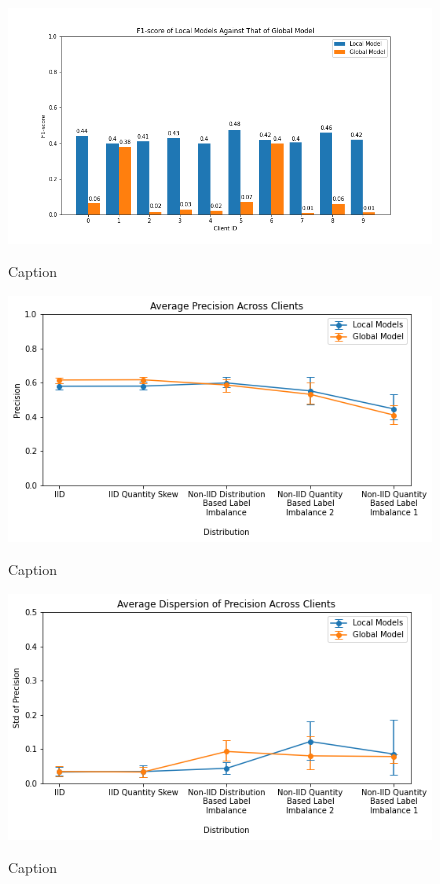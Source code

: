 \documentclass[letterpaper]{article} %
\begin{document}
\begin{figure}[hbt!]
{\includegraphics[width=\columnwidth]{noniid-quantity-based-label-imbalance-1_seed_5performance_of_models_on_client_data_f1score}}
\caption{Caption}
\end{figure}


\begin{figure}[hbt!]
{\includegraphics[width=\columnwidth]{Avg_precision_of_local_models_against_that_of_global_model}}
\caption{Caption}
\end{figure}

\begin{figure}[hbt!]
{\includegraphics[width=\columnwidth]{Avg_dispersion_of_precision_of_local_models_against_that_of_global_model}}
\caption{Caption}
\end{figure}
\end{document}
